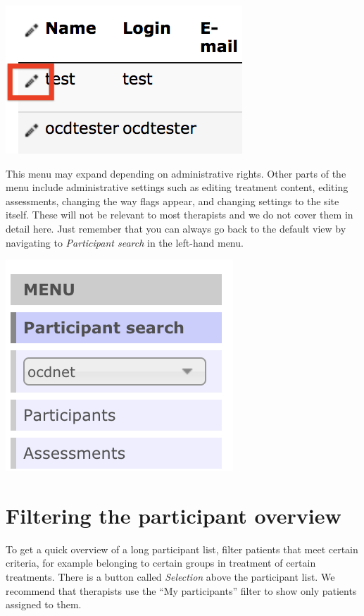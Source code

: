 \documentclass[]{book}
\theoremstyle{definition}
\theoremstyle{definition}
\theoremstyle{definition}
\theoremstyle{remark}
\begin{document}
\includegraphics{images/pencil.png}

This menu may expand depending on administrative rights. Other parts of
the menu include administrative settings such as editing treatment
content, editing assessments, changing the way flags appear, and
changing settings to the site itself. These will not be relevant to most
therapists and we do not cover them in detail here. Just remember that
you can always go back to the default view by navigating to
\emph{Participant search} in the left-hand menu.

\includegraphics{images/therapist-menu.png}

\hypertarget{filtering-the-participant-overview}{%
\section{Filtering the participant
overview}\label{filtering-the-participant-overview}}

To get a quick overview of a long participant list, filter patients that
meet certain criteria, for example belonging to certain groups in
treatment of certain treatments. There is a button called
\emph{Selection} above the participant list. We recommend that
therapists use the ``My participants'' filter to show only patients
assigned to them.
\end{document}
